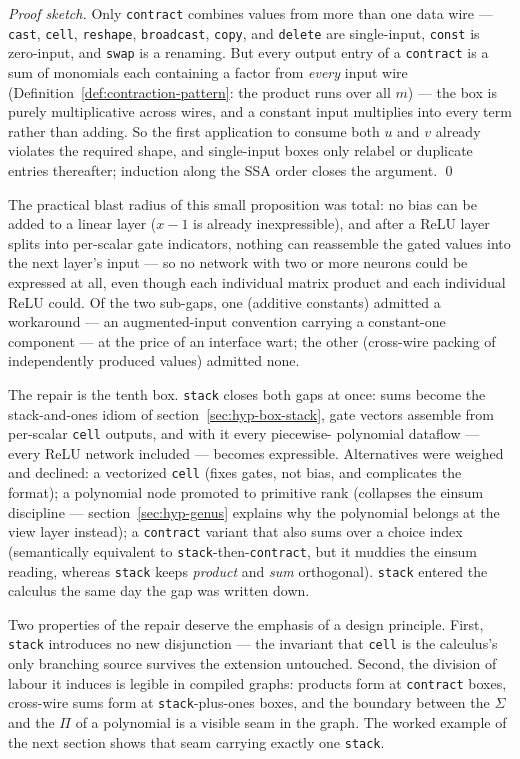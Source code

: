 \emph{Proof sketch.} Only \texttt{contract} combines values from more
than one data wire ---
\texttt{cast}, \texttt{cell}, \texttt{reshape}, \texttt{broadcast},
\texttt{copy}, and \texttt{delete} are single-input, \texttt{const}
is zero-input, and \texttt{swap} is a renaming. But every output
entry of a \texttt{contract} is a sum of monomials each containing a
factor from \emph{every} input wire
(Definition~\ref{def:contraction-pattern}: the product runs over all
$m$) --- the box is purely multiplicative across wires, and a
constant input multiplies into every term rather than adding. So the
first application to consume both $u$ and $v$ already violates the
required shape, and single-input boxes only relabel or duplicate
entries thereafter; induction along the SSA order closes the
argument. \qed

The practical blast radius of this small proposition was total: no
bias can be added to a linear layer ($x - 1$ is already
inexpressible), and after a ReLU layer splits into per-scalar gate
indicators, nothing can reassemble the gated values into the next
layer's input --- so no network with two or more neurons could be
expressed at all, even though each individual matrix product and each
individual ReLU could. Of the two sub-gaps, one (additive constants)
admitted a workaround --- an augmented-input convention carrying a
constant-one component --- at the price of an interface wart; the
other (cross-wire packing of independently produced values) admitted
none.

The repair is the tenth box. \texttt{stack} closes both gaps at once:
sums become the stack-and-ones idiom of
section~\ref{sec:hyp-box-stack}, gate vectors assemble from
per-scalar \texttt{cell} outputs, and with it every piecewise-%
polynomial dataflow --- every ReLU network included --- becomes
expressible. Alternatives were weighed and declined: a vectorized
\texttt{cell} (fixes gates, not bias, and complicates the format); a
polynomial node promoted to primitive rank (collapses the einsum
discipline --- section~\ref{sec:hyp-genus} explains why the
polynomial belongs at the view layer instead); a \texttt{contract}
variant that also sums over a choice index (semantically equivalent
to \texttt{stack}-then-\texttt{contract}, but it muddies the einsum
reading, whereas \texttt{stack} keeps \emph{product} and \emph{sum}
orthogonal). \texttt{stack} entered the calculus the same day the
gap was written down.

Two properties of the repair deserve the emphasis of a design
principle. First, \texttt{stack} introduces no new disjunction ---
the invariant that \texttt{cell} is the calculus's only branching
source survives the extension untouched. Second, the division of
labour it induces is legible in compiled graphs: products form at
\texttt{contract} boxes, cross-wire sums form at
\texttt{stack}-plus-ones boxes, and the boundary between the
$\Sigma$ and the $\Pi$ of a polynomial is a visible seam in the
graph. The worked example of the next section shows that seam
carrying exactly one \texttt{stack}.

